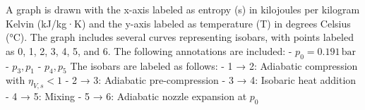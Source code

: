 A graph is drawn with the x-axis labeled as entropy (s) in kilojoules per kilogram Kelvin (kJ/kg·K) and the y-axis labeled as temperature (T) in degrees Celsius (°C). The graph includes several curves representing isobars, with points labeled as 0, 1, 2, 3, 4, 5, and 6. The following annotations are included:  
- \( p_0 = 0.191 \, \text{bar} \)  
- \( p_3, p_1 \)  
- \( p_4, p_5 \)  
The isobars are labeled as follows:  
- 1 → 2: Adiabatic compression with \( \eta_{V,s} < 1 \)  
- 2 → 3: Adiabatic pre-compression  
- 3 → 4: Isobaric heat addition  
- 4 → 5: Mixing  
- 5 → 6: Adiabatic nozzle expansion at \( p_0 \)